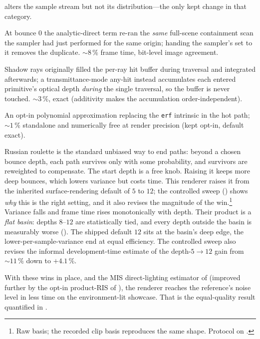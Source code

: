 \begin{description}
  alters the sample stream but not its distribution---the only kept change in that category.
  \item[Dedup bounce-0 scan.] At bounce $0$ the analytic-direct term re-ran the \emph{same} full-scene
  containment scan the sampler had just performed for the same origin; handing the sampler's set to
  it removes the duplicate. ${\sim}8\,\%$ frame time, bit-level image agreement.
  \item[Any-hit transmittance fusion.] Shadow rays originally filled the per-ray hit buffer during
  traversal and integrated afterwards; a transmittance-mode any-hit instead accumulates each entered
  primitive's optical depth \emph{during} the single traversal, so the buffer is never touched.
  ${\sim}3\,\%$, exact (additivity makes the accumulation order-independent).
  \item[Fast erf.] An opt-in polynomial approximation replacing the \texttt{erf} intrinsic in the hot
  path; ${\sim}1\,\%$ standalone and numerically free at render precision (kept opt-in,
  default exact).
  \item[Russian-roulette start depth.] Russian roulette is the standard unbiased way to end paths: beyond a chosen bounce depth,
  each path survives only with some probability, and survivors are reweighted to compensate.
  The start depth is a free knob. Raising it keeps more deep bounces, which lowers variance
  but costs time. This renderer raises it from the inherited surface-rendering default of $5$
  to $12$; the controlled sweep () shows \emph{why} this is the right setting,
  and it also revises the magnitude of the win.\footnote{Raw basis; the recorded clip basis reproduces the same shape. Protocol on
.} Variance falls and frame time rises monotonically with depth.
  Their product is a \emph{flat basin}: depths $8$--$12$ are statistically tied, and every
  depth outside the basin is measurably worse (). The shipped default $12$
  sits at the basin's deep edge, the lower-per-sample-variance end at equal efficiency. The
  controlled sweep also revises the informal development-time estimate of the
  depth-$5\!\to\!12$ gain from ${\sim}11\,\%$ down to $+4.1\,\%$.
\end{description}
With these wins in place, and the MIS direct-lighting estimator of 
(improved further by the opt-in product-RIS of ), the renderer reaches the
reference's noise level in less time on the environment-lit showcase. That is the equal-quality
result quantified in .

